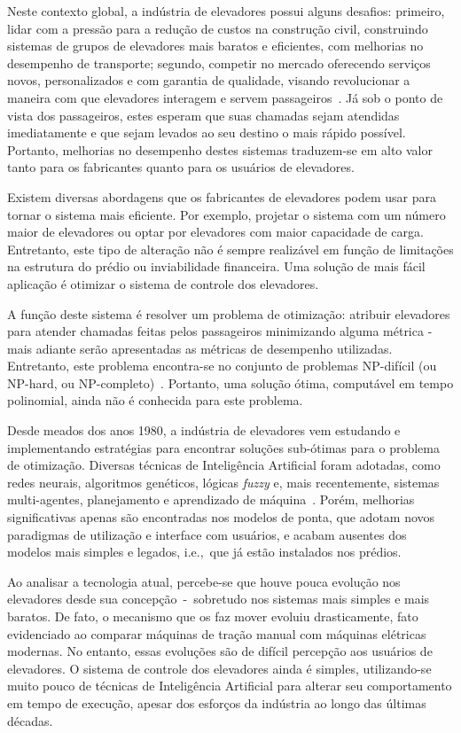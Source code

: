 Neste contexto global, a indústria de elevadores possui alguns desafios:
primeiro, lidar com a pressão para a redução de custos na construção civil,
construindo sistemas de grupos de elevadores mais baratos e eficientes, com
melhorias no desempenho de transporte; segundo, competir no mercado oferecendo
serviços novos, personalizados e com garantia de qualidade, visando revolucionar
a maneira com que elevadores interagem e servem
passageiros~\cite{KOEHLEROTTIGER02}. Já sob o ponto de vista dos passageiros,
estes esperam que suas chamadas sejam atendidas imediatamente e que sejam
levados ao seu destino o mais rápido possível. Portanto, melhorias no desempenho
destes sistemas traduzem-se em alto valor tanto para os fabricantes quanto para
os usuários de elevadores.

Existem diversas abordagens que os fabricantes de elevadores podem usar para
tornar o sistema mais eficiente. Por exemplo, projetar o sistema com um número
maior de elevadores ou optar por elevadores com maior capacidade de carga.
Entretanto, este tipo de alteração não é sempre realizável em função de
limitações na estrutura do prédio ou inviabilidade financeira. Uma solução de
mais fácil aplicação é otimizar o sistema de controle dos elevadores.

A função deste sistema é resolver um problema de otimização: atribuir elevadores
para atender chamadas feitas pelos passageiros minimizando alguma métrica - mais
adiante serão apresentadas as métricas de desempenho utilizadas. Entretanto,
este problema encontra-se no conjunto de problemas NP-difícil (ou NP-hard, ou
NP-completo)~\cite{SeKo99}. Portanto, uma solução ótima, computável em tempo
polinomial, ainda não é conhecida para este problema.

Desde meados dos anos 1980, a indústria de elevadores vem estudando e
implementando estratégias para encontrar soluções sub-ótimas para o problema de
otimização. Diversas técnicas de Inteligência Artificial foram adotadas, como
redes neurais, algoritmos genéticos, lógicas \textit{fuzzy} e, mais
recentemente, sistemas multi-agentes, planejamento e aprendizado de
máquina~\cite{KOEHLEROTTIGER02}. Porém, melhorias significativas apenas são
encontradas nos modelos de ponta, que adotam novos paradigmas de utilização e
interface com usuários, e acabam ausentes dos modelos mais simples e
legados, i.e.,~que já estão instalados nos prédios.

Ao analisar a tecnologia atual, percebe-se que houve pouca evolução nos
elevadores desde sua concepção~-~sobretudo nos sistemas mais simples e mais
baratos. De fato, o mecanismo que os faz mover evoluiu drasticamente, fato
evidenciado ao comparar máquinas de tração manual com máquinas elétricas
modernas. No entanto, essas evoluções são de difícil percepção aos usuários de
elevadores. O sistema de controle dos elevadores ainda é simples, utilizando-se
muito pouco de técnicas de Inteligência Artificial para alterar seu
comportamento em tempo de execução, apesar dos esforços da indústria ao longo
das últimas décadas.


